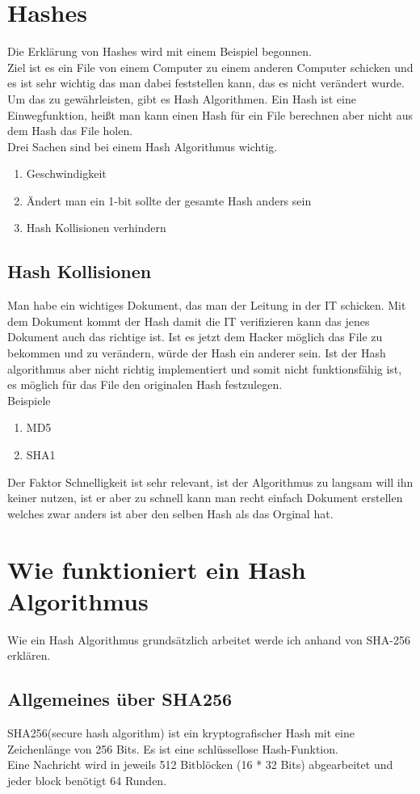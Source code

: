 {\section{Hashes}
\label{hash-expl}
Die Erklärung von Hashes wird mit einem Beispiel begonnen.
\\Ziel ist es ein File von einem Computer zu einem anderen Computer schicken und es ist sehr wichtig das man dabei feststellen kann, das es nicht verändert wurde. Um das zu gewährleisten, gibt es Hash Algorithmen. Ein Hash ist eine Einwegfunktion, heißt man kann einen Hash für ein File berechnen aber nicht aus dem Hash das File holen.\\
Drei Sachen sind bei einem Hash Algorithmus wichtig.
\begin{enumerate}
\item Geschwindigkeit
\item Ändert man ein 1-bit sollte der gesamte Hash anders sein
\item Hash Kollisionen verhindern 
\end{enumerate}
\subsection{Hash Kollisionen}
\label{sec:hash_coll}
Man habe ein wichtiges Dokument, das man der Leitung in der IT schicken. Mit dem Dokument kommt der Hash damit die IT verifizieren kann das jenes Dokument auch das richtige ist. Ist es jetzt dem Hacker möglich das File zu bekommen und zu verändern, würde der Hash ein anderer sein. Ist der Hash algorithmus aber nicht richtig implementiert und somit nicht funktionsfähig ist, es möglich für das File den originalen Hash festzulegen.
\\
Beispiele
\begin{enumerate}
\item MD5
\item SHA1
\end{enumerate}
Der Faktor Schnelligkeit ist sehr relevant, ist der Algorithmus zu langsam will ihn keiner nutzen, ist er aber zu schnell kann man recht einfach Dokument erstellen welches zwar anders ist aber den selben Hash als das Orginal hat.
\section{Wie funktioniert ein Hash Algorithmus}
\label{sec:hash_algo}
Wie ein Hash Algorithmus grundsätzlich arbeitet werde ich anhand von SHA-256 erklären. 
\subsection{Allgemeines über SHA256}
\label{sec:hash_sha}
SHA256(secure hash algorithm) ist ein kryptografischer Hash mit eine Zeichenlänge von 256 Bits. Es ist eine schlüssellose Hash-Funktion.
\\
Eine Nachricht wird in jeweils 512 Bitblöcken (16 * 32 Bits) abgearbeitet und jeder block benötigt 64 Runden.
}
